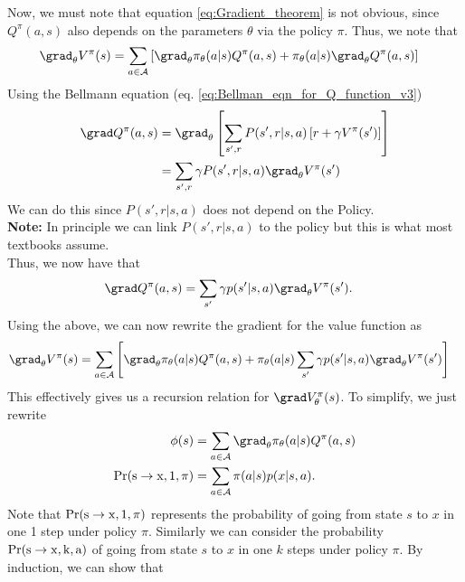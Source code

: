 \begin{tcolorbox}[title= Proof of the Gradient Theorem, height = \textheight, breakable]
    Now, we must note that equation \ref{eq:Gradient_theorem} is not obvious, since $Q^{\pi}(a,s)$ also depends on the parameters $\theta$ via the policy $\pi$. Thus, we note that 
    \begin{align}
        \grad_{\theta} V^{\pi}(s) &=  \sum_{a \in \mathcal{A}}\left[\grad_{\theta} \pi_{\theta}(a|s) Q^{\pi}(a,s)+  \pi_{\theta}(a|s) \grad_{\theta} Q^{\pi}(a,s)\right] 
    \end{align}
    Using the Bellmann equation (eq. \ref{eq:Bellman_eqn_for_Q_function_v3})
    \begin{align}
        \grad Q^{\pi}(a,s) &= \grad_{\theta} \left[\sum_{s',r} P(s',r|s,a)\left[r + \gamma V^{\pi}(s') \right]\right] \\
        &=  \sum_{s',r} \gamma P(s',r|s,a)   \grad_{\theta}V^{\pi}(s') 
    \end{align}
    We can do this since $P(s',r|s,a)$ does not depend on the Policy. \\
    {\color{red}\textbf{Note:} In principle we can link $P(s',r|s,a)$ to the policy but this is what most textbooks assume.}
    \\
    Thus, we now have that 
    \begin{align}
         \grad Q^{\pi}(a,s) &= \sum_{s'} \gamma p(s'|s,a)   \grad_{\theta}V^{\pi}(s').
    \end{align}
    Using the above, we can now rewrite the gradient for the value function as 
    \begin{align}
        \grad_{\theta} V^{\pi}(s) &=  \sum_{a \in \mathcal{A}}\left[\grad_{\theta} \pi_{\theta}(a|s) Q^{\pi}(a,s)+  \pi_{\theta}(a|s) \sum_{s'} \gamma p(s'|s,a)   \grad_{\theta}V^{\pi}(s')\right] 
    \end{align} 
    This effectively gives us a recursion relation for $\grad V_{\theta}^{\pi}(s)$. To simplify, we just rewrite 
    \begin{align}
        \phi(s) &= \sum_{a \in \mathcal{A}} \grad_{\theta}\pi_{\theta}(a|s) Q^{\pi}(a,s) \\
        \rm{Pr}(s\rightarrow x,1,\pi)&= \sum_{a\in \mathcal{A}} \pi(a|s) p(x|s,a).
    \end{align}
    Note that $\rm{Pr}(s\rightarrow x,1,\pi)$ represents the probability of going from state $s$ to $x$ in one 1 step under policy $\pi$. Similarly we can consider the probability $\rm{Pr}(s\rightarrow x,k,a)$ of going from state $s$ to $x$ in one $k$ steps under policy $\pi$. By induction, we can show that 

\end{tcolorbox}
